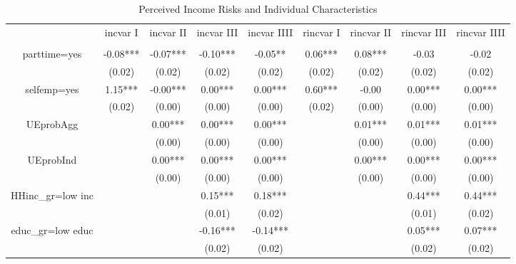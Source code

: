 
\begin{table}[p]
\centering
\begin{adjustbox}{width=\textwidth}
\begin{threeparttable}
\caption{Perceived Income Risks and Individual Characteristics}
\label{micro_reg}\begin{tabular}{ccccccccc}
\toprule
{} &  incvar I & incvar II & incvar III & incvar IIII & rincvar I & rincvar II & rincvar III & rincvar IIII \\
                 &           &           &            &             &           &            &             &              \\
\midrule
parttime=yes     &  -0.08*** &  -0.07*** &   -0.10*** &     -0.05** &   0.06*** &    0.08*** &       -0.03 &        -0.02 \\
                 &    (0.02) &    (0.02) &     (0.02) &      (0.02) &    (0.02) &     (0.02) &      (0.02) &       (0.02) \\
selfemp=yes      &   1.15*** &  -0.00*** &    0.00*** &     0.00*** &   0.60*** &      -0.00 &     0.00*** &      0.00*** \\
                 &    (0.02) &    (0.00) &     (0.00) &      (0.00) &    (0.02) &     (0.00) &      (0.00) &       (0.00) \\
UEprobAgg        &           &   0.00*** &    0.00*** &     0.00*** &           &    0.01*** &     0.01*** &      0.01*** \\
                 &           &    (0.00) &     (0.00) &      (0.00) &           &     (0.00) &      (0.00) &       (0.00) \\
UEprobInd        &           &   0.00*** &    0.00*** &     0.00*** &           &    0.00*** &     0.00*** &      0.00*** \\
                 &           &    (0.00) &     (0.00) &      (0.00) &           &     (0.00) &      (0.00) &       (0.00) \\
HHinc\_gr=low inc &           &           &    0.15*** &     0.18*** &           &            &     0.44*** &      0.44*** \\
                 &           &           &     (0.01) &      (0.02) &           &            &      (0.01) &       (0.02) \\
educ\_gr=low educ &           &           &   -0.16*** &    -0.14*** &           &            &     0.05*** &      0.07*** \\
                 &           &           &     (0.02) &      (0.02) &           &            &      (0.02) &       (0.02) \\

\end{tabular}
\end{threeparttable}
\end{adjustbox}
\end{table}
